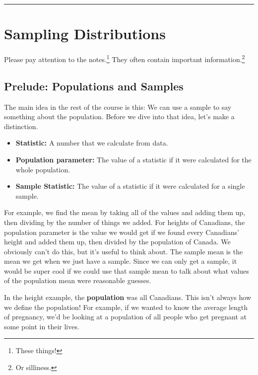 \documentclass[
  letterpaper,
  DIV=11,
  numbers=noendperiod,
  oneside]{scrreprt}
\providecommand{\tightlist}{%
  \setlength{\itemsep}{0pt}\setlength{\parskip}{0pt}}\usepackage{longtable,booktabs,array}
\begin{document}
\begin{center}\rule{0.5\linewidth}{0.5pt}\end{center}

\hypertarget{sampling-distributions}{%
\chapter{Sampling Distributions}\label{sampling-distributions}}

Please pay attention to the notes.\footnote{These things!} They often
contain important information.\footnote{Or silliness.}

\hypertarget{prelude-populations-and-samples}{%
\section{Prelude: Populations and
Samples}\label{prelude-populations-and-samples}}

The main idea in the rest of the course is this: We can use a sample to
say something about the population. Before we dive into that idea, let's
make a distinction.

\begin{itemize}
\tightlist
\item
  \textbf{Statistic:} A number that we calculate from data.
\item
  \textbf{Population parameter:} The value of a statistic if it were
  calculated for the whole population.
\item
  \textbf{Sample Statistic:} The value of a statistic if it were
  calculated for a single sample.
\end{itemize}

For example, we find the mean by taking all of the values and adding
them up, then dividing by the number of things we added. For heights of
Canadians, the population parameter is the value we would get if we
found every Canadians' height and added them up, then divided by the
population of Canada. We obviously can't do this, but it's useful to
think about. The sample mean is the mean we get when we just have a
sample. Since we can only get a sample, it would be super cool if we
could use that sample mean to talk about what values of the population
mean were reasonable guesses.

In the height example, the \textbf{population} was all Canadians. This
isn't always how we define the population! For example, if we wanted to
know the average length of pregnancy, we'd be looking at a population of
all people who get pregnant at some point in their lives.
\end{document}
